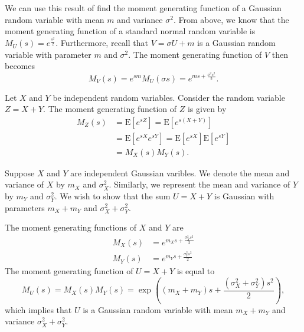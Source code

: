 \begin{example}
We can use this result of find the moment generating function of a Gaussian random variable with mean $m$ and variance $\sigma^2$.
From above, we know that the moment generating function of a standard normal random variable is $M_U (s) = e^{\frac{s^2}{2}}$.
Furthermore, recall that $V = \sigma U + m$ is a Gaussian random variable with parameter $m$ and $\sigma^2$.
The moment generating function of $V$ then becomes
\begin{equation*}
M_V (s) = e^{sm} M_U (\sigma s) = e^{m s + \frac{\sigma^2 s^2}{2}} .
\end{equation*}
\end{example}

Let $X$ and $Y$ be independent random variables.
Consider the random variable $Z = X + Y$.
The moment generating function of $Z$ is given by
\begin{equation*}
\begin{split}
M_Z (s) &= \mathrm{E} \left[ e^{sZ} \right]
= \mathrm{E} \left[ e^{s(X + Y)} \right] \\
&= \mathrm{E} \left[ e^{sX} e^{sY} \right]
= \mathrm{E} \left[ e^{sX} \right] \mathrm{E} \left[ e^{sY} \right] \\
&= M_X(s) M_Y(s) .
\end{split}
\end{equation*}

\begin{example}
Suppose $X$ and $Y$ are independent Gaussian varibles.
We denote the mean and variance of $X$ by $m_X$ and $\sigma_X^2$.
Similarly, we represent the mean and variance of $Y$ by $m_Y$ and $\sigma_Y^2$. 
We wish to show that the sum $U = X + Y$ is Gaussian with parameters $m_X + m_Y$ and $\sigma_X^2 + \sigma_Y^2$.

The moment generating functions of $X$ and $Y$ are
\begin{align*}
M_X (s) &= e^{m_X s + \frac{\sigma_X^2 s^2}{2}} \\
M_Y (s) &= e^{m_Y s + \frac{\sigma_Y^2 s^2}{2}}
\end{align*}
The moment generating function of $U = X + Y$ is equal to
\begin{equation*}
M_U (s) = M_X (s) M_Y (s)
= \exp \left( (m_X + m_Y) s + \frac{(\sigma_X^2 + \sigma_Y^2) s^2}{2} \right) ,
\end{equation*}
which implies that $U$ is a Gaussian random variable with mean $m_X + m_Y$ and variance $\sigma_X^2 + \sigma_Y^2$.
\end{example}


